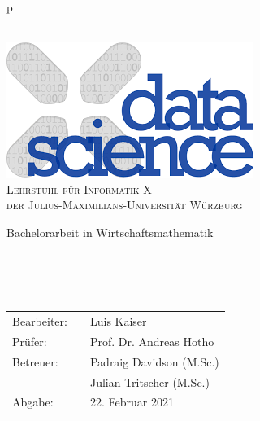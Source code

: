 
\begin{center}
\begin{tabular}{p{\textwidth}}


\begin{center}
	\\[0.8 cm]
	\includegraphics[scale=0.7]{logos/data_science_logo.png}
	\\[0.8 cm]
	\huge{\textsc{Lehrstuhl für Informatik X}} 
	\\[0.2 cm]
	\Large{\textsc{der Julius-Maximilians-Universität Würzburg}}
	\\[1.8 cm]
\end{center}

\begin{center}
	\large{Bachelorarbeit in Wirtschaftsmathematik}
	\\[0.7 cm]
\end{center}

\begin{center}
	\LARGE{\textbf{
		\getTitleGer\\
		\\[0.8 cm]
		\getTitleEng}}
		\\[1.6 cm]
\end{center}

\begin{center}
\begin{tabular}{lll}
{Bearbeiter:} & & Luis Kaiser\\
{Prüfer:} & & Prof. Dr. Andreas Hotho\\
{Betreuer:} & & Padraig Davidson (M.Sc.)\\
 & & Julian Tritscher (M.Sc.)\\
{Abgabe:} & & 22. Februar 2021\\
\end{tabular}
\end{center}

\end{tabular}
\end{center}


